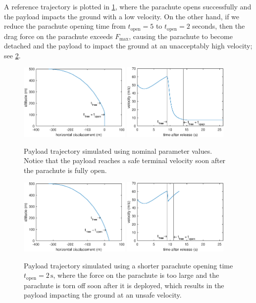 \documentclass[11pt]{article}
\begin{document}
A reference trajectory is plotted in \cref{fig:trajectory}, where the parachute opens successfully and the payload impacts the ground with a low velocity. On the other hand, if we reduce the parachute opening time from $t_\text{open}=5$ to $t_\text{open}=2$ seconds, then the drag force on the parachute exceeds $F_\text{max}$, causing the parachute to become detached and the payload to impact the ground at an unacceptably high velocity; see \cref{fig:trajectory-torn}.
\begin{figure}[H]
\includegraphics[width=0.48\textwidth]{figures/trajectory.eps}
\includegraphics[width=0.46\textwidth]{figures/velocity.eps}
\hspace{0.07\textwidth}
\caption{Payload trajectory simulated using nominal parameter values. Notice that the payload reaches a safe terminal velocity soon after the parachute is fully open.}
\label{fig:trajectory}
\end{figure}
\begin{figure}[H]
\includegraphics[width=0.48\textwidth]{figures/trajectory_torn.eps}
\includegraphics[width=0.46\textwidth]{figures/velocity_torn.eps}
\hfill
\caption{Payload trajectory simulated using a shorter parachute opening time $t_\text{open}=2\,\text{s}$, where the force on the parachute is too large and the parachute is torn off soon after it is deployed, which results in the payload impacting the ground at an unsafe velocity. }
\label{fig:trajectory-torn}
\end{figure}
\end{document}
